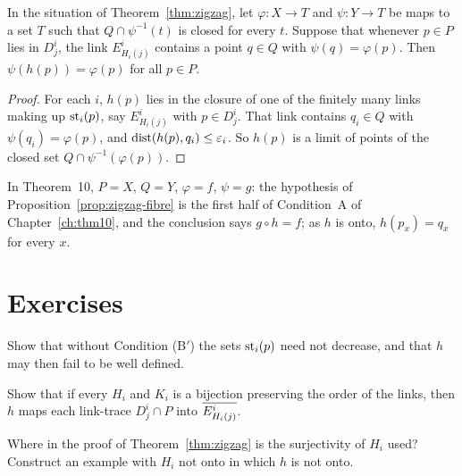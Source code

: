 \begin{proposition}\label{prop:zigzag-fibre}
In the situation of Theorem~\ref{thm:zigzag}, let $\varphi\colon X\to T$ and $\psi\colon Y\to T$ be maps to a set $T$ such that $Q\cap\psi^{-1}(t)$ is closed for every $t$.
Suppose that whenever $p\in P$ lies in $D^i_j$, the link $E^i_{H_i(j)}$ contains a point $q\in Q$ with $\psi(q)=\varphi(p)$. Then $\psi(h(p))=\varphi(p)$ for all $p\in P$.
\end{proposition}

\begin{proof}
For each $i$, $h(p)$ lies in the closure of one of the finitely many links making up $\operatorname{st}_i(p)$, say $E^i_{H_i(j)}$ with $p\in D^i_j$. That link contains $q_i\in Q$ with
$\psi(q_i)=\varphi(p)$, and $\operatorname{dist}(h(p),q_i)\le\varepsilon_i$. So $h(p)$ is a limit of points of the closed set $Q\cap\psi^{-1}(\varphi(p))$.
\end{proof}


In Theorem~10, $P=X$, $Q=Y$, $\varphi=f$, $\psi=g$: the hypothesis of Proposition~\ref{prop:zigzag-fibre} is the first half of Condition~A of Chapter~\ref{ch:thm10}, and the
conclusion says $g\circ h=f$; as $h$ is onto, $h(p_x)=q_x$ for every $x$.

\section*{Exercises}

\begin{exercise}
Show that without Condition (B$'$) the sets $\operatorname{st}_i(p)$ need not decrease, and that $h$ may then fail to be well defined.
\end{exercise}

\begin{exercise}
Show that if every $H_i$ and $K_i$ is a bijection preserving the order of the links, then $h$ maps each link-trace $D^i_j\cap P$ into $\overline{E^i_{H_i(j)}}$.
\end{exercise}

\begin{exercise}
Where in the proof of Theorem~\ref{thm:zigzag} is the surjectivity of $H_i$ used? Construct an example with $H_i$ not onto in which $h$ is not onto.
\end{exercise}
